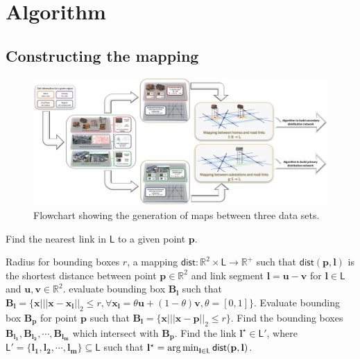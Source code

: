 \section{Algorithm}
\subsection{Constructing the mapping}\label{subsec:map}
\begin{figure}
	\centering
	\includegraphics[scale=0.42]{pipeline_1}
	\caption{Flowchart showing the generation of maps between three data sets.}
\end{figure}
\begin{algorithm}[H]
	\caption{Find the nearest link in $\mathsf{L}$ to a given point $\mathbf{p}$.}
	\label{alg:dist}
	\begin{algorithmic}[1]
		\Require Radius for bounding boxes $r$, a mapping $\mathsf{dist}:\mathbb{R}^2\times\mathsf{L}\rightarrow\mathbb{R}^{+}$ such that $\mathsf{dist}(\mathbf{p},\mathbf{l})$ is the shortest distance between point $\mathbf{p}\in\mathbb{R}^2$ and link segment $\mathbf{l}=\mathbf{u}-\mathbf{v}$ for $\mathbf{l}\in\mathsf{L}$ and $\mathbf{u},\mathbf{v}\in\mathbb{R}^2$.
		\State evaluate bounding box $\mathbf{B_l}$ such that $\mathbf{B_l}=\big\{\mathbf{x}\big|||\mathbf{x}-\mathbf{x_l}||_2\leq r,\forall \mathbf{x_l}=\theta\mathbf{u}+(1-\theta)\mathbf{v},\theta=[0,1]\big\}$.
		\EndFor
		\State Evaluate bounding box $\mathbf{B_p}$ for point $\mathbf{p}$ such that $\mathbf{B_l}=\big\{\mathbf{x}\big|||\mathbf{x}-\mathbf{p}||_2\leq r\big\}$.
		\State Find the bounding boxes $\mathbf{B_{l_1}},\mathbf{B_{l_2}},\cdots,\mathbf{B_{l_m}}$ which intersect with $\mathbf{B_p}$.
		\State Find the link $\mathbf{l^\star}\in\mathsf{L'}$, where $\mathsf{L'}=\{\mathbf{l_1},\mathbf{l_2},\cdots,\mathbf{l_m}\}\subseteq\mathsf{L}$ such that $\mathbf{l^\star}=\operatorname*{arg\,min}_{\mathbf{l}\in\mathsf{L}}\mathsf{dist}(\mathbf{p},\mathbf{l})$.
	\end{algorithmic}
\end{algorithm}
